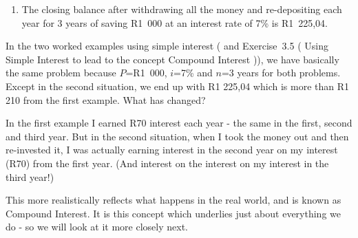 {\begin{mdframed}[linewidth=4, leftmargin=40, rightmargin=40]
\begin{exercise}
\begin{enumerate}[noitemsep, label=\textbf{Step} \textbf{\arabic*}. ]
{    \setlength{\mymathboxwidth}{\columnwidth}
      \addtolength{\mymathboxwidth}{-48pt}
    \par\vspace{12pt}\noindent\begin{minipage}{\columnwidth}
    \parbox[t]{\mymathboxwidth}{\large$
    \mathrm{A}=P\left(1+i\ensuremath{\cdot}n\right)=\mathrm{R}1\phantom{\rule{3.33333pt}{0ex}}144,90\left(1+1\ensuremath{\times}7\%\right)=\mathrm{R}1\phantom{\rule{3.33333pt}{0ex}}225,04$}\hfill
    \parbox[t]{48pt}{\raggedleft 
    (3.20)}
    \end{minipage}\vspace{12pt}\par
    }%
      \item  
      \label{m39334*id72567}The closing balance after withdrawing all the money and re-depositing each year for 3 years of saving R1~000 at an interest rate of 7\% is R1~225,04. \par 
      \end{enumerate}
    \end{exercise}
    \end{mdframed}
    }
    \noindent
      \label{m39334*id72585}In the two worked examples using simple interest ( and Exercise~3.5 ( Using Simple Interest to lead to the concept Compound Interest )), we have basically the same problem because $P$=R1~000, \begin{math}i\end{math}=7\% and \begin{math}n\end{math}=3 years for both problems. Except in the second situation, we end up with R1 225,04 which is more than R1 210 from the first example. What has changed?\par 
      \label{m39334*id72618}In the first example I earned R70 interest each year - the same in the first, second and third year. But in the second situation, when I took the money out and then re-invested it, I was actually earning interest in the second year on my interest (R70) from the first year. (And interest on the interest on my interest in the third year!)\par 
      \label{m39334*id72624}This more realistically reflects what happens in the real world, and is known as Compound Interest. It is this concept which underlies just about everything we do - so we will look at it more closely next.\par 

